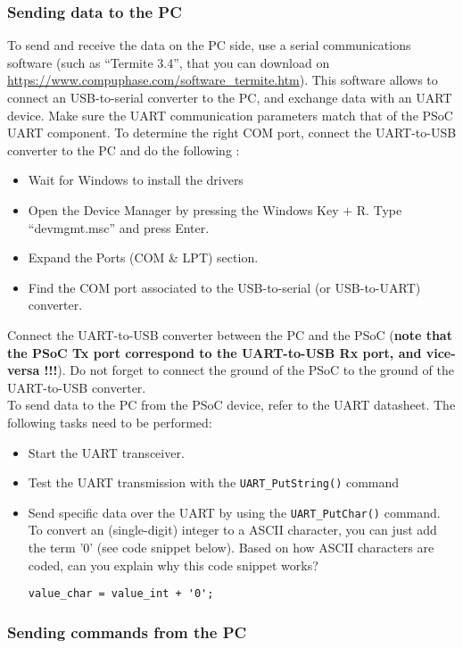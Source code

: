 \subsubsection{Sending data to the PC}
To send and receive the data on the PC side, use a serial communications software (such as ``Termite 3.4'', that you can download on \url{https://www.compuphase.com/software_termite.htm}). This software allows to connect an USB-to-serial converter to the PC, and exchange data with an UART device. Make sure the UART communication parameters match that of the PSoC UART component. To determine the right COM port, connect the UART-to-USB converter to the PC and do the following : 
\begin{itemize}
\item Wait for Windows to install the drivers
\item Open the Device Manager by pressing the Windows Key $+$ R. Type “devmgmt.msc” and press Enter.
\item Expand the Ports (COM \& LPT) section.
\item Find the COM port associated to the USB-to-serial (or USB-to-UART) converter. 
\end{itemize}
Connect the UART-to-USB converter between the PC and the PSoC (\textbf{note that the PSoC Tx port correspond to the UART-to-USB Rx port, and vice-versa !!!}). Do not forget to connect the ground of the PSoC to the ground of the UART-to-USB converter. 
\\
To send data to the PC from the PSoC device, refer to the UART datasheet. The following tasks need to be performed: 
\begin{itemize}
	\item Start the UART transceiver. 
	\item Test the UART transmission with the \texttt{UART\_PutString()} command
	\item Send specific data over the UART by using the \texttt{UART\_PutChar()} command. To convert an (single-digit) integer to a ASCII character, you can just add the term '0' (see code snippet below). Based on how ASCII characters are coded, can you explain why this code snippet works? 
\begin{lstlisting}[style=customc]
value_char = value_int + '0'; 
\end{lstlisting}
\end{itemize}


\subsubsection{Sending commands from the PC}

